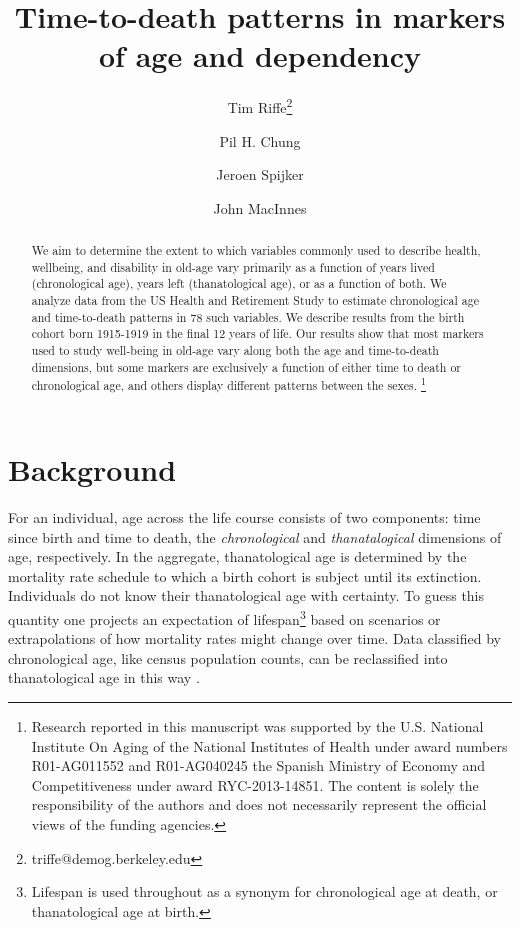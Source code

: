 \documentclass[11pt,oneside]{article} %
\newcommand\ackn[1]{%
  \begingroup
  \renewcommand\thefootnote{}\footnote{#1}%
  \addtocounter{footnote}{-1}%
  \endgroup
}
\begin{document}
\title{Time-to-death patterns in markers of age and dependency}

\author[1]{Tim Riffe\thanks{triffe@demog.berkeley.edu}}
\author[1]{Pil H. Chung}
\author[2]{Jeroen Spijker}
\author[3]{John MacInnes}



\maketitle

\begin{abstract}
We aim to determine the extent to which variables commonly
used to describe health, wellbeing, and disability in old-age vary primarily
as a function of years lived (chronological age), years left (thanatological
age), or as a function of both.
We analyze data from the US Health and Retirement Study to estimate chronological age and time-to-death patterns in 78 such variables. We describe
results from the birth cohort born 1915-1919 in the final 12 years of life. Our results show
that most markers used to study well-being in old-age vary along both the age
and time-to-death dimensions, but some markers are exclusively a function of
either time to death or chronological age, and others display different patterns
between the sexes.\ackn{Research reported in this manuscript
was supported by the U.S.
National Institute On Aging of the National Institutes of Health under award
numbers R01-AG011552 and R01-AG040245 the Spanish Ministry of Economy and
Competitiveness under award RYC-2013-14851. The content is solely the
responsibility of the authors and does not necessarily represent the official views of the funding agencies.}
\end{abstract}

\section*{Background}

For an
individual, age across the life course consists of two components: time since
birth and time to death, the \textit{chronological} and \textit{thanatalogical}
dimensions of age, respectively. In the aggregate, thanatological age is determined
by the mortality rate schedule to which a birth cohort is subject until its
extinction. Individuals do not know their thanatological age with certainty. To
guess this quantity one projects an expectation of lifespan\footnote{Lifespan
is used throughout as a synonym for chronological age at death, or
thanatological age at birth.} based on scenarios or extrapolations of how
mortality rates might change over time. Data classified by chronological age, like census population counts, can be reclassified into thanatological age in this way \citep{brouard1986structure}.
\end{document}
